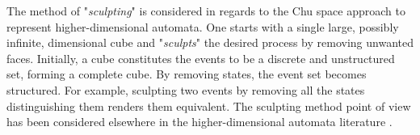 



    
    The method of "\emph{sculpting}" is considered in regards to the Chu space approach to represent higher-dimensional automata. One starts with a single large, possibly infinite, dimensional cube and "\emph{sculpts}" the desired process by removing unwanted faces. Initially, a cube constitutes the events to be a discrete and unstructured set, forming a complete cube. By removing states, the event set becomes structured. For example, sculpting two events by removing all the states distinguishing them renders them equivalent. The sculpting method point of view has been considered elsewhere in the higher-dimensional automata literature \cite{Goubault92homologyof, Fajstrup98detectingdeadlocks}.
    

